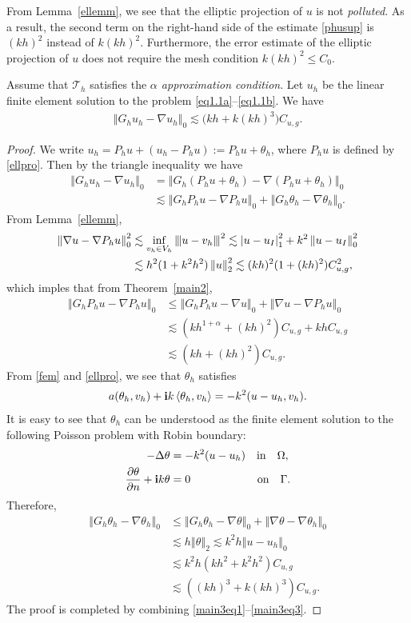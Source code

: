 \documentclass[leqno,final]{siamltex}
\numberwithin{equation}{section}
\newcommand{\norm}[1]{\left\Vert#1\right\Vert}
\newcommand{\norme}[1]{\left\Vert{\hskip -2.7pt}\left\vert #1 \right\vert{\hskip -2.7pt}\right\Vert}
\newcommand{\abs}[1]{\left\vert#1\right\vert}
\newcommand{\pd}[1]{\left\langle #1\right\rangle}
\newcommand{\nn}{\nonumber}
\newcommand{\ls}{\lesssim}
\newcommand{\al}{\alpha}
\newcommand{\De}{\Delta}
\newcommand{\Ga}{\Gamma}
\newcommand{\na}{\nabla}
\newcommand{\Om}{\Omega}
\newcommand{\pa}{\partial}
\newcommand{\ta}{\theta}
\renewcommand{\i}{{\rm\mathbf i}}
\newcommand{\T}{\mathcal{T}}
\newcommand{\eq}[1]{\begin{align}#1\end{align}}
\newcommand{\eqn}[1]{\begin{align*}#1\end{align*}}
\begin{document}
From Lemma~\ref{ellemm}, we {see} that the elliptic projection of $u$ is not \emph{polluted}.
As a result, the second {term on the right-hand} side of the estimate \eqref{phusup} is $(kh)^2$
instead of $k(kh)^2$. {Furthermore}, the error estimate of the elliptic projection of $u$
does not require the mesh condition $k(kh)^2\leq C_0$.

\begin{theorem}\label{main3}
Assume that $\T_h$ satisfies the \emph{$\al$ approximation condition}.
Let $u_h$ be the linear finite element solution to the problem \eqref{eq1.1a}--\eqref{eq1.1b}. We have
\eq{ \norm{G_hu_h-\na u_h}_0\ls \big(kh+k(kh)^3\big) C_{u,g}. \label{eq:th2eq1} }
\end{theorem}
\begin{proof}
We write $u_h=P_hu+(u_h-P_hu):=P_hu+\ta_h$, where $P_hu$ is defined by \eqref{ellpro}.
Then by the triangle inequality we have
\eq{ \norm{G_hu_h-\na u_h}_0 &= \norm{G_h(P_hu+\ta_h)-\na (P_hu+\ta_h)}_0\label{main3eq1}\\
&\ls \norm{G_hP_hu-\na P_hu}_0 + \norm{G_h\ta_h-\na \ta_h}_0. \nn}
From Lemma~\ref{ellemm},
\eqn{ \norm{\na u-\na P_hu}_0^2 &\ls \inf_{v_h\in V_h} \norme{u-v_h}^2 \ls \abs{u-u_I}_1^2 + k^2\norm{u-u_I}_0^2 \\
&\ls h^2(1+k^2h^2)\norm{u}_2^2 \ls (kh)^2 (1+(kh)^2) C_{u,g}^2, }
which imples that from Theorem~\ref{main2},
\eq{ \norm{G_hP_hu-\na P_hu}_0 &\leq \norm{G_hP_hu-\na u}_0 + \norm{\na u-\na P_hu}_0 \label{main3eq2}\\
&\ls (kh^{1+\al}+(kh)^2)C_{u,g} + khC_{u,g} \nn\\
&\ls (kh+(kh)^2)C_{u,g}. \nn }
From \eqref{fem} and \eqref{ellpro}, we see that $\ta_h$ satisfies
\eq{ a(\ta_h,v_h) + \i k\pd{\ta_h,v_h} = - k^2(u-u_h,v_h). }
It is easy to see that $\ta_h$ can be understood as the finite element solution to the following Poisson problem
with Robin boundary:
\eqn{ -\De \ta &= -k^2(u-u_h) \quad\mathrm{in} \quad \Om,\\
\frac{\pa \ta}{\pa n} + \i k\ta &= 0\quad\quad\quad\quad\qquad\mathrm{on}\quad \Ga.  }
Therefore,
\eq{ \norm{G_h\ta_h-\na \ta_h}_0 &\leq \norm{G_h\ta_h-\na \ta}_0 +  \norm{\na\ta-\na \ta_h}_0\label{main3eq3}\\
&\ls h\norm{\ta}_2\ls k^2h\norm{u-u_h}_0\nn\\
&\ls k^2h(kh^2+k^2h^2)C_{u,g}\nn\\
&\ls ((kh)^3+k(kh)^3)C_{u,g}.\nn }
The proof is completed by combining \eqref{main3eq1}--\eqref{main3eq3}.
\end{proof}
\end{document}
